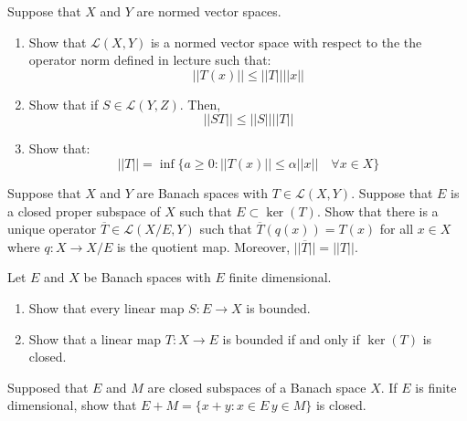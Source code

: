 \documentclass[12pt]{article}
\begin{document}


\begin{problab}{30}
    Suppose that $X$ and $Y$ are normed vector spaces. 
    \begin{enumerate}
        \item Show that $\mathcal{L}(X, Y)$ is a normed vector space with respect to the the operator norm defined in lecture such that: 
        \[ ||T(x)|| \leq ||T|| ||x|| \]
        \item Show that if $S \in \mathcal{L}(Y, Z)$. Then, 
        \[  ||ST|| \leq ||S||||T|| \]
        \item Show that: 
        \[ ||T|| = \inf\{ a \geq 0 : ||T(x)|| \leq \alpha||x|| \quad \forall x \in X\}\]
    \end{enumerate}
\end{problab}
\begin{solu} 

\end{solu}
\newpage 

\begin{problab}{31}
    Suppose that $X$ and $Y$ are Banach spaces with $T \in \mathcal{L}(X, Y)$. Suppose that $E$ is a closed proper subspace of $X$ such that $E \subset \ker(T)$. Show that there is a unique operator $\overline{T} \in \mathcal{L}(X/E, Y)$ such that $\overline{T}(q(x)) = T(x)$ for all $x \in X$ where $q: X \to X/E$ is the quotient map. Moreover, $||\overline{T}|| = ||T||$.
\end{problab}
\begin{solu} 

\end{solu}
\newpage 


\begin{problab}{33}
    Let $E$ and $X$ be Banach spaces with $E$ finite dimensional. 
    \begin{enumerate}
        \item Show that every linear map $S: E \to X$ is bounded. 
        \item Show that a linear map $T: X \to E$ is bounded if and only if $\ker(T)$ is closed. 
    \end{enumerate}
\end{problab}
\begin{solu} 

\end{solu}
\newpage 

\begin{problab}{34}
    Supposed that $E$ and $M$ are closed subspaces of a Banach space $X$. If $E$ is finite dimensional, show that $E+M = \{x+y: x \in E \, y \in M\}$ is closed. 
\end{problab}
\begin{solu} 

\end{solu}
\newpage 
\end{document}

